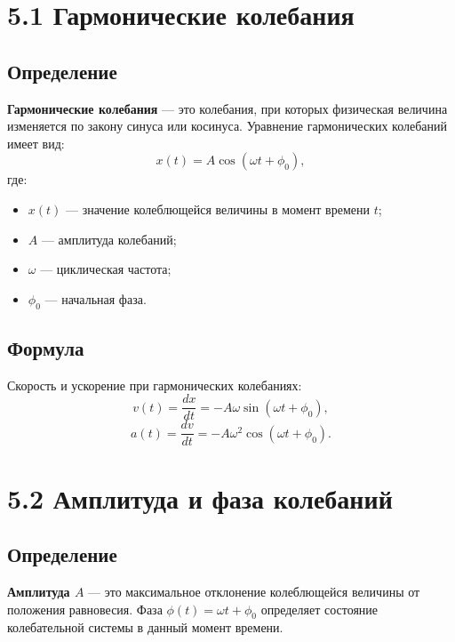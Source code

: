 \documentclass[a4paper, 12pt]{article}
\begin{document}
\begin{center}
\end{center}


\section*{5.1 Гармонические колебания}
\vspace{-9pt}
\subsection*{Определение}
\vspace{-3pt}
\textbf{Гармонические колебания} — это колебания, при которых физическая величина изменяется по закону синуса или косинуса. Уравнение гармонических колебаний имеет вид:
$$ x(t) = A \cos(\omega t + \phi_0),$$
где:
\begin{itemize}[itemsep=0pt, topsep=0pt, parsep=0pt]
  \item $ x(t)$ — значение колеблющейся величины в момент времени $ t$;
  \item $ A$ — амплитуда колебаний;
  \item $ \omega$ — циклическая частота;
  \item $ \phi_0$ — начальная фаза.
\end{itemize}

\vspace{-9pt}
\subsection*{Формула}
\vspace{-3pt}
Скорость и ускорение при гармонических колебаниях:
$$ v(t) = \frac{dx}{dt} = -A \omega \sin(\omega t + \phi_0),$$
$$ a(t) = \frac{dv}{dt} = -A \omega^2 \cos(\omega t + \phi_0).$$

\section*{5.2 Амплитуда и фаза колебаний}
\vspace{-9pt}
\subsection*{Определение}
\vspace{-3pt}
\textbf{Амплитуда $A$} — это максимальное отклонение колеблющейся величины от положения равновесия. Фаза $ \phi(t) = \omega t + \phi_0$ определяет состояние колебательной системы в данный момент времени.
\end{document}
